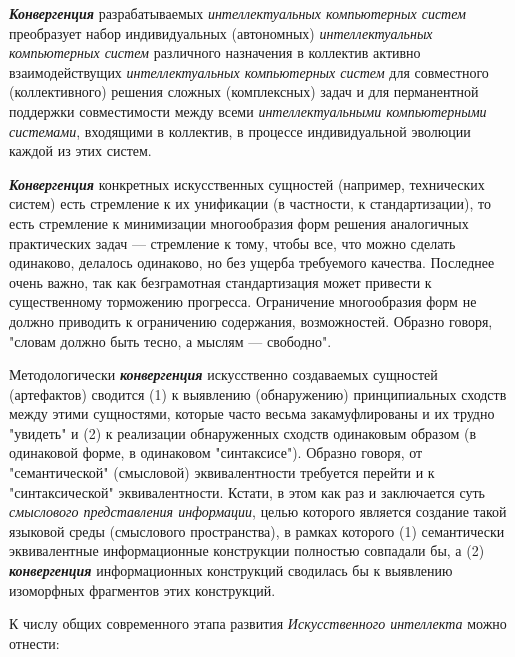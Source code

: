 \textbf{\textit{Конвергенция}} разрабатываемых \textit{интеллектуальных компьютерных систем} преобразует набор индивидуальных (автономных) \textit{интеллектуальных компьютерных систем} различного назначения в коллектив активно взаимодействущих \textit{интеллектуальных компьютерных систем} для совместного (коллективного) решения сложных (комплексных) задач и для перманентной поддержки совместимости между всеми \textit{интеллектуальными компьютерными системами}, входящими в коллектив, в процессе индивидуальной эволюции каждой из этих систем.

\textbf{\textit{Конвергенция}} конкретных искусственных сущностей (например, технических систем) есть стремление к их унификации (в частности, к стандартизации), то есть стремление к минимизации многообразия форм решения аналогичных практических задач --- стремление к тому, чтобы все, что можно сделать одинаково, делалось одинаково, но без ущерба требуемого качества. Последнее очень важно, так как безграмотная стандартизация может привести к существенному торможению прогресса. Ограничение многообразия форм не должно приводить к ограничению содержания, возможностей. Образно говоря, "словам должно быть тесно, а мыслям --- свободно"{}.

Методологически \textbf{\textit{конвергенция}} искусственно создаваемых сущностей (артефактов) сводится (1) к выявлению (обнаружению) принципиальных сходств между этими сущностями, которые часто весьма закамуфлированы и их трудно "увидеть"{} и (2) к реализации обнаруженных сходств одинаковым образом (в одинаковой форме, в одинаковом "синтаксисе"{}). Образно говоря, от "семантической"{} (смысловой) эквивалентности требуется перейти и к "синтаксической"{} эквивалентности. Кстати, в этом как раз и заключается суть \textit{смыслового представления информации}, целью которого является создание такой языковой среды (смыслового пространства), в рамках которого (1) семантически эквивалентные информационные конструкции полностью совпадали бы, а (2) \textbf{\textit{конвергенция}} информационных конструкций сводилась бы к выявлению изоморфных фрагментов этих конструкций.

К числу общих  современного этапа развития \textit{Искусственного интеллекта} можно отнести:

